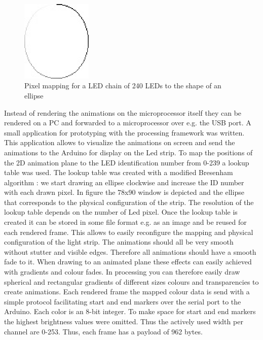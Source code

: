 \begin{figure}
    \includegraphics[width=0.3\textwidth]{fig/240id}
    \caption[Pixel Mapping]{Pixel mapping for a LED chain of 240 LEDs to the shape of an ellipse}
    \label{fig:Pixel}
\end{figure}
Instead of rendering the animations on the microprocessor itself they can be rendered on a PC and forwarded to a microprocessor over e.g. the USB port. 
A small application for prototyping with the processing framework was written. This application allows to visualize the animations on screen and send the animations to the Arduino for display on the Led strip. To map the positions of the 2D animation plane to the LED identification number from 0-239 a lookup table was used. The lookup table was created with a modified Bresenham algorithm \cite{MidpointAlgorithm}: we start drawing an ellipse clockwise and increase the ID number with each drawn pixel. In figure  the 78x90 window is depicted and the ellipse that corresponds to the physical configuration of the strip. The resolution of the lookup table depends on the number of Led pixel. Once the lookup table is created it can be stored in some file format e.g. as an image and be reused for each rendered frame. This allows to easily reconfigure the mapping and physical configuration of the light strip. The animations should all be very smooth without stutter and visible edges. Therefore all animations should have a smooth fade to it. When drawing to an animated plane these effects can easily achieved with gradients and colour fades. In processing you can therefore easily draw spherical and rectangular gradients of different sizes colours and transparencies to create animations. Each rendered frame the mapped colour data is send with a simple protocol  facilitating start and end markers over the serial port to the Arduino. Each color is an 8-bit integer. To make space for start and end markers the highest brightness values were omitted. Thus the actively used width per channel are 0-253. Thus, each frame has a payload of 962 bytes. 


